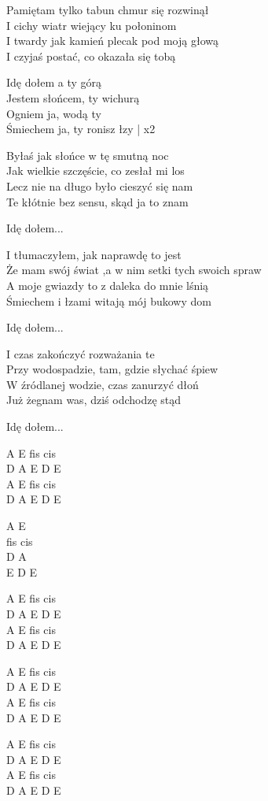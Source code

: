 \begin{text}
    Pamiętam tylko tabun chmur się rozwinął\\    
    I cichy wiatr wiejący ku połoninom\\
    I twardy jak kamień plecak pod moją głową\\
    I czyjaś postać, co okazała się tobą

    \vin Idę dołem a ty górą\\
    \vin Jestem słońcem, ty wichurą\\
    \vin Ogniem ja, wodą ty\\
    \vin Śmiechem ja, ty ronisz łzy | x2

    Byłaś jak słońce w tę smutną noc\\ 
    Jak wielkie szczęście, co zesłał mi los\\ 
    Lecz nie na długo było cieszyć się nam\\ 
    Te kłótnie bez sensu, skąd ja to znam

    \vin Idę dołem...

    I tłumaczyłem, jak naprawdę to jest\\
    Że mam swój świat ,a w nim setki tych swoich spraw\\
    A moje gwiazdy to z daleka do mnie lśnią\\
    Śmiechem i łzami witają mój bukowy dom

    \vin Idę dołem...

    I czas zakończyć rozważania te\\
    Przy wodospadzie, tam, gdzie słychać śpiew\\
    W źródlanej wodzie, czas zanurzyć dłoń\\
    Już żegnam was, dziś odchodzę stąd

    \vin Idę dołem...
\end{text}
\begin{chord}
    A E fis cis\\
    D A E D E\\
    A E fis cis\\
    D A E D E

    A E\\
    fis cis\\
    D A\\
    E D E

    A E fis cis\\
    D A E D E\\
    A E fis cis\\
    D A E D E\\
    \hfill\break

    A E fis cis\\
    D A E D E\\
    A E fis cis\\
    D A E D E\\
    \hfill\break

    A E fis cis\\
    D A E D E\\
    A E fis cis\\
    D A E D E
\end{chord}

